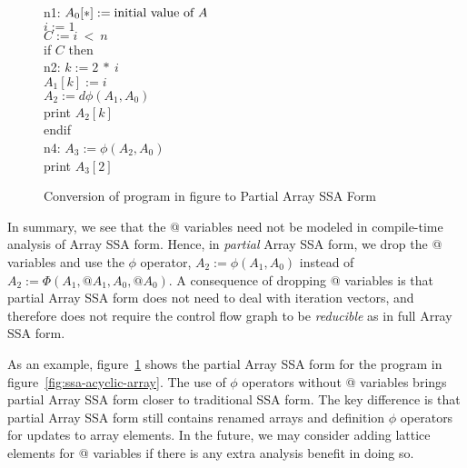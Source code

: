 \begin{figure}%
\begin{center}
\parbox{3.0in}{
\begin{programa}
\mbox{n1:} 
\Tb $A_0[*] := \mbox{\rm initial value of $A$}$\\
\Tb $i := 1$ \\
\Tb $C := i\ <\ n $ \\
\Tb if $C$ then \\
\mbox{n2:}
\Tc $k :=  2\ *\ i$ \\
\Tc $A_1[k] := i$\\
\Tc $A_2 := d\phi(A_1, A_0)$\\
\Tc print $A_2[k]$\\
\Tb endif \\
\mbox{n4:} 
\Tb $A_3 := \phi(A_2, A_0)$\\
\Tb print $A_3[2]$ 
\end{programa}
}
\end{center}
\caption{Conversion of program in figure \protect{\ref{fig:ssa-acyclic-array}} to Partial Array SSA Form}
\label{fig:partial-form}
\end{figure}



In summary, we see that the @ variables need not be modeled in
compile-time analysis of Array SSA form.  Hence, in {\it partial}
Array SSA form, we drop the @ variables and use the
$\phi$ operator, $A_2 := \phi(A_1, A_0)$ instead of
$A_2 := \Phi(A_1, @A_1, A_0, @A_0)$.
A consequence of dropping @ variables is that partial Array
SSA form does not need to deal with iteration
vectors, and therefore does not require the control flow
graph to be {\it reducible} as in full Array SSA form.

As an example, figure~\ref{fig:partial-form} shows 
the partial Array SSA form for the program
in figure~\ref{fig:ssa-acyclic-array}.
The use of $\phi$ operators without @ variables brings
partial Array SSA form closer to traditional SSA form.
The key difference is that partial Array SSA form still contains 
renamed arrays and definition $\phi$ operators for updates to array elements.
In the future, we may consider adding lattice elements for @ variables
if there is any extra analysis benefit in doing so.
